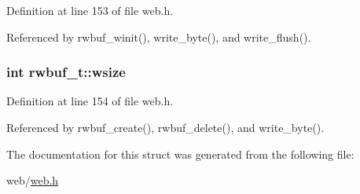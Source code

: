 Definition at line 153 of file web.\-h.



Referenced by rwbuf\-\_\-winit(), write\-\_\-byte(), and write\-\_\-flush().

\hypertarget{structrwbuf__t_ac723cf150dd35d0f67ba7d38b18863ad}{
\subsubsection[{wsize}]{\setlength{\rightskip}{0pt plus 5cm}int rwbuf\-\_\-t\-::wsize}}\label{structrwbuf__t_ac723cf150dd35d0f67ba7d38b18863ad}


Definition at line 154 of file web.\-h.



Referenced by rwbuf\-\_\-create(), rwbuf\-\_\-delete(), and write\-\_\-byte().



The documentation for this struct was generated from the following file\-:\begin{DoxyCompactItemize}
\item 
web/\hyperlink{web_8h}{web.\-h}\end{DoxyCompactItemize}
